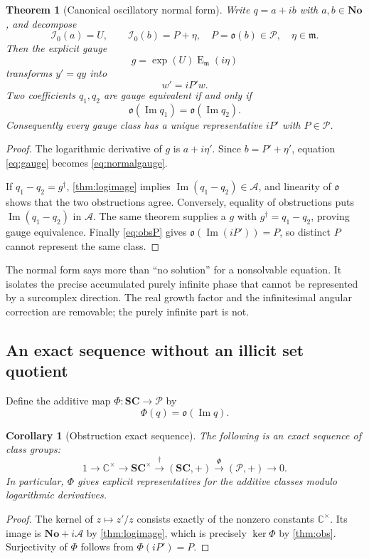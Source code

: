 \documentclass[11pt,letterpaper]{article}
\numberwithin{equation}{section}
\newtheorem{theorem}{Theorem}[section]
\newtheorem{corollary}[corollary]{Corollary}
\theoremstyle{definition}
\theoremstyle{remark}
\newcommand{\No}{\mathbf{No}}
\newcommand{\SC}{\mathbf{SC}}
\newcommand{\C}{\mathbb C}
\newcommand{\mm}{\mathfrak m}
\newcommand{\PPi}{\mathcal P}
\newcommand{\ARate}{\mathcal A}
\newcommand{\im}{\operatorname{Im}}
\newcommand{\Em}{\operatorname{E}_{\mm}}
\newcommand{\Izero}{\mathcal I_0}
\newcommand{\Obs}{\mathfrak o}
\begin{document}
\begin{theorem}[Canonical oscillatory normal form]\label{thm:gauge}
Write $q=a+ib$ with $a,b\in\No$, and decompose
\[
 \Izero(a)=U,\qquad \Izero(b)=P+\eta,
 \quad P=\Obs(b)\in\PPi,\quad\eta\in\mm.
\]
Then the explicit gauge
\[
 g=\exp(U)\Em(i\eta)
\]
transforms $y'=qy$ into
\begin{equation}\label{eq:normalgauge}
 w'=iP'w.
\end{equation}
Two coefficients $q_1,q_2$ are gauge equivalent if and only if
\[
 \Obs(\im q_1)=\Obs(\im q_2).
\]
Consequently every gauge class has a unique representative $iP'$ with $P\in\PPi$.
\end{theorem}
\begin{proof}
The logarithmic derivative of $g$ is $a+i\eta'$. Since $b=P'+\eta'$, equation \eqref{eq:gauge} becomes \eqref{eq:normalgauge}.

If $q_1-q_2=g^\dagger$, \cref{thm:logimage} implies $\im(q_1-q_2)\in\ARate$, and linearity of $\Obs$ shows that the two obstructions agree. Conversely, equality of obstructions puts $\im(q_1-q_2)$ in $\ARate$. The same theorem supplies a $g$ with $g^\dagger=q_1-q_2$, proving gauge equivalence. Finally \eqref{eq:obsP} gives $\Obs(\im(iP'))=P$, so distinct $P$ cannot represent the same class.
\end{proof}

The normal form says more than ``no solution'' for a nonsolvable equation. It isolates the precise accumulated purely infinite phase that cannot be represented by a surcomplex direction. The real growth factor and the infinitesimal angular correction are removable; the purely infinite part is not.

\subsection{An exact sequence without an illicit set quotient}
Define the additive map $\Phi:\SC\to\PPi$ by
\[
 \Phi(q)=\Obs(\im q).
\]

\begin{corollary}[Obstruction exact sequence]\label{cor:exact}
The following is an exact sequence of class groups:
\begin{equation}\label{eq:exact}
 1\longrightarrow\C^\times\longrightarrow\SC^\times
 \xrightarrow{\;\dagger\;}(\SC,+)
 \xrightarrow{\;\Phi\;}(\PPi,+)\longrightarrow0.
\end{equation}
In particular, $\Phi$ gives explicit representatives for the additive classes modulo logarithmic derivatives.
\end{corollary}
\begin{proof}
The kernel of $z\mapsto z'/z$ consists exactly of the nonzero constants $\C^\times$. Its image is $\No+i\ARate$ by \cref{thm:logimage}, which is precisely $\ker\Phi$ by \cref{thm:obs}. Surjectivity of $\Phi$ follows from $\Phi(iP')=P$.
\end{proof}
\end{document}
